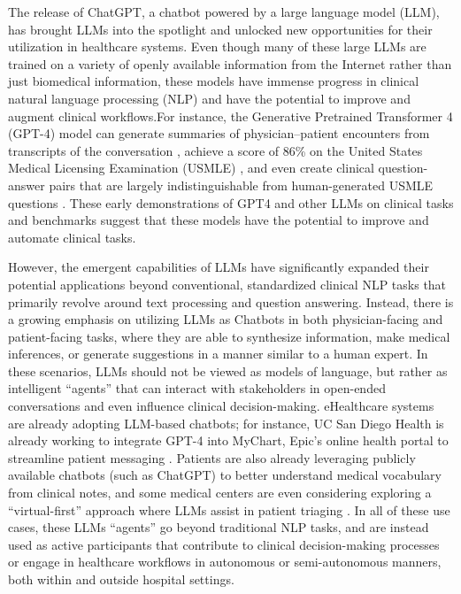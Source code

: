 \documentclass[10pt]{article}
\begin{document}
\begin{multicols}{2}
The release of ChatGPT, a chatbot powered by a large language model (LLM), has brought LLMs into the spotlight and unlocked new opportunities for their utilization in healthcare systems. Even though many of these large LLMs are trained on a variety of openly available information from the Internet rather than just biomedical information, these models have immense progress in clinical natural language processing (NLP) \cite{agrawal2022large,brown2020language,bubeck2023sparks} and have the potential to improve and augment clinical workflows.For instance, the Generative Pretrained Transformer 4 (GPT-4) model can generate summaries of physician–patient encounters from transcripts of the conversation \cite{lee2023benefits}, achieve a score of 86\% on the United States Medical Licensing Examination (USMLE) \cite{fleming2023assessing}, and even create clinical question-answer pairs that are largely indistinguishable from human-generated USMLE questions \cite{nori2023capabilities}. These early demonstrations of GPT4 and other LLMs on clinical tasks and benchmarks suggest that these models have the potential to improve and automate clinical tasks.

However, the emergent capabilities of LLMs have significantly expanded their potential applications beyond conventional, standardized clinical NLP tasks that primarily revolve around text processing and question answering. Instead, there is a growing emphasis on utilizing LLMs as Chatbots in both physician-facing and patient-facing tasks, where they are able to synthesize information, make medical inferences, or generate suggestions in a manner similar to a human expert\cite{lee2023benefits,dash2023evaluation,wornow2023shaky}. In these scenarios, LLMs should not be viewed as models of language, but rather as intelligent “agents” that can interact with stakeholders in open-ended conversations and even influence clinical decision-making. eHealthcare systems are already adopting LLM-based chatbots; for instance, UC San Diego Health is already working to integrate GPT-4 into MyChart, Epic’s online health portal to streamline patient messaging \cite{DrChatbot}. Patients are also already leveraging publicly available chatbots (such as ChatGPT) to better understand medical vocabulary from clinical notes, and some medical centers are even considering exploring a “virtual-first” approach where LLMs assist in patient triaging \cite{levine2023diagnostic,korngiebel2021considering}. In all of these use cases, these LLMs “agents” go beyond traditional NLP tasks, and are instead used as active participants that contribute to clinical decision-making processes or engage in healthcare workflows in autonomous or semi-autonomous manners, both within and outside hospital settings. 


\end{multicols}
\end{document}
